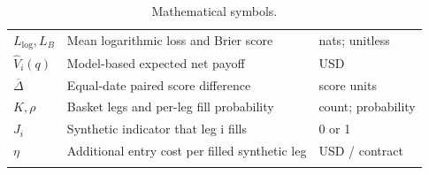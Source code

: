 {\begin{longtable}{@{}L{30mm}L{96mm}L{32mm}@{}}
$L_{\log},L_B$ & Mean logarithmic loss and Brier score & nats; unitless \\ \hline
$\widehat V_i(q)$ & Model-based expected net payoff & USD \\ \hline
$\overline\Delta$ & Equal-date paired score difference & score units \\ \hline
$K,\rho$ & Basket legs and per-leg fill probability & count; probability \\ \hline
$J_i$ & Synthetic indicator that leg i fills & 0 or 1 \\ \hline
$\eta$ & Additional entry cost per filled synthetic leg & USD / contract \\ \hline
{}\bottomrule
\caption[Mathematical symbols]{Mathematical symbols.}\label{tab:symbols}\\
\end{longtable}}
